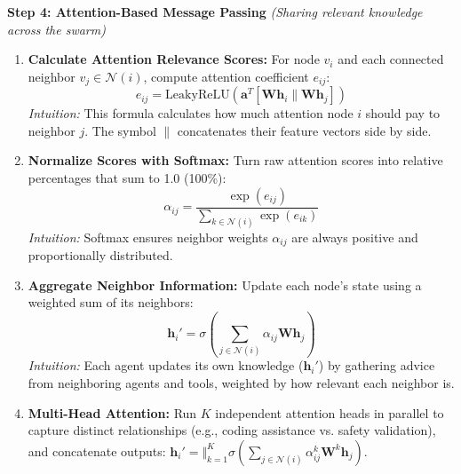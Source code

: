 \documentclass[11pt,a4paper]{article}
\begin{document}
\vspace{0.5em}
\textbf{Step 4: Attention-Based Message Passing} \emph{(Sharing relevant knowledge across the swarm)}
\begin{enumerate}[leftmargin=1.5em, itemsep=0.25em, topsep=0.08em]
    \item \textbf{Calculate Attention Relevance Scores:} For node $v_i$ and each connected neighbor $v_j \in \mathcal{N}(i)$, compute attention coefficient $e_{ij}$:
    \[
    e_{ij} = \mathrm{LeakyReLU}\left(\mathbf{a}^T [\mathbf{W} \mathbf{h}_i \parallel \mathbf{W} \mathbf{h}_j]\right)
    \]
    \emph{Intuition:} This formula calculates how much attention node $i$ should pay to neighbor $j$. The symbol $\parallel$ concatenates their feature vectors side by side.
    \item \textbf{Normalize Scores with Softmax:} Turn raw attention scores into relative percentages that sum to 1.0 (100\%):
    \[
    \alpha_{ij} = \frac{\exp(e_{ij})}{\sum_{k \in \mathcal{N}(i)} \exp(e_{ik})}
    \]
    \emph{Intuition:} Softmax ensures neighbor weights $\alpha_{ij}$ are always positive and proportionally distributed.
    \item \textbf{Aggregate Neighbor Information:} Update each node's state using a weighted sum of its neighbors:
    \[
    \mathbf{h}_i' = \sigma\left(\sum_{j \in \mathcal{N}(i)} \alpha_{ij} \mathbf{W} \mathbf{h}_j\right)
    \]
    \emph{Intuition:} Each agent updates its own knowledge ($\mathbf{h}_i'$) by gathering advice from neighboring agents and tools, weighted by how relevant each neighbor is.
    \item \textbf{Multi-Head Attention:} Run $K$ independent attention heads in parallel to capture distinct relationships (e.g., coding assistance vs. safety validation), and concatenate outputs: $\mathbf{h}_i' = \Vert_{k=1}^K \sigma\left(\sum_{j \in \mathcal{N}(i)} \alpha_{ij}^k \mathbf{W}^k \mathbf{h}_j\right)$.
\end{enumerate}

\newpage

\end{document}
